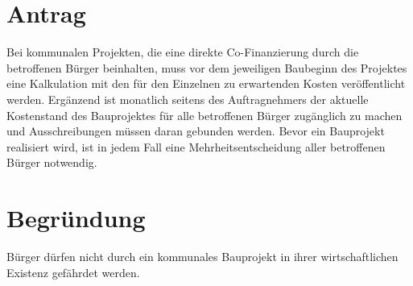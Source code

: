 \section{Antrag}

Bei kommunalen Projekten, die eine direkte Co-Finanzierung durch die betroffenen Bürger beinhalten, muss vor dem jeweiligen Baubeginn des Projektes eine Kalkulation mit den für den Einzelnen zu erwartenden Kosten veröffentlicht werden. Ergänzend ist monatlich seitens des Auftragnehmers der aktuelle Kostenstand des Bauprojektes für alle betroffenen Bürger zugänglich zu machen und Ausschreibungen müssen daran gebunden werden. Bevor ein Bauprojekt realisiert wird, ist in jedem Fall eine Mehrheitsentscheidung aller betroffenen Bürger notwendig.

\section{Begründung}

Bürger dürfen nicht durch ein kommunales Bauprojekt in ihrer wirtschaftlichen Existenz gefährdet werden.
